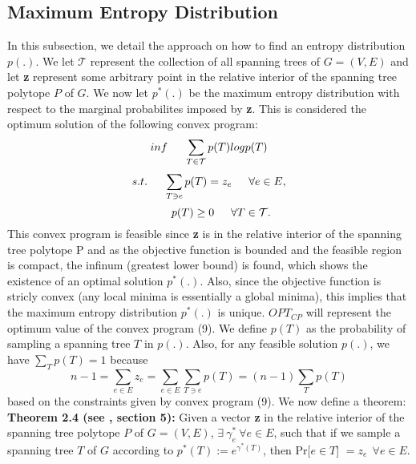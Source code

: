 \documentclass[oneside]{projectpaper} %
\begin{document}
\subsection{Maximum Entropy Distribution}
In this subsection, we detail the approach on how to find an entropy distribution $p(.)$. We let $\mathcal{T}$ represent the collection of all spanning trees of $G = (V, E)$ and let \textbf{z} represent some arbitrary point in the relative interior of the spanning tree polytope $P$ of $G$. We now let $p^*(.)$ be the maximum entropy distribution with respect to the marginal probabilites imposed by \textbf{z}. This is considered the optimum solution of the following convex program:
\begin{equation}
inf \indent \sum\limits_{T \in \mathcal{T}}p(T)logp(T)
\end{equation}
\begin{equation*}
s.t. \indent \sum\limits_{T \ni e}p(T) = z_e \indent \forall e \in E,
\end{equation*}
\begin{equation*}
\indent \ \ p(T) \geq 0 \indent \forall T \in \mathcal{T}.
\end{equation*}
This convex program is feasible since \textbf{z} is in the relative interior of the spanning tree polytope P and as the objective function is bounded and the feasible region is compact, the infinum (greatest lower bound) is found, which shows the existence of an optimal solution $p^*(.)$. Also, since the objective function is stricly convex (any local minima is essentially a global minima), this implies that the maximum entropy distribution $p^*(.)$ is unique. $OPT_{CP}$ will represent the optimum value of the convex program (9). \newline
\indent We define $p(T)$ as the probability of sampling a spanning tree $T$ in $p(.)$. Also, for any feasible solution $p(.)$, we have $\sum\limits_{T}p(T) = 1$ because
\begin{equation*}
n - 1 = \sum\limits_{e \in E}z_e = \sum\limits_{e \in E}\sum\limits_{T \ni e}p(T) = (n - 1)\sum\limits_{T}p(T)
\end{equation*}
based on the constraints given by convex program (9). We now define a theorem: 
\newline
\newline
\textbf{Theorem 2.4 (see \cite{AGM10}, section 5):} Given a vector \textbf{z} in the relative interior of the spanning tree polytope $P$ of $G = (V, E)$, $\exists \ \gamma_{e}^{*} \ \forall e\in E$, such that if we sample a spanning tree $T$ of $G$ according to $p^*(T) := e^{\gamma^*(T)}$, then Pr[$e \in T$] $= z_e \ \ \forall e \in E$.
\end{document}
